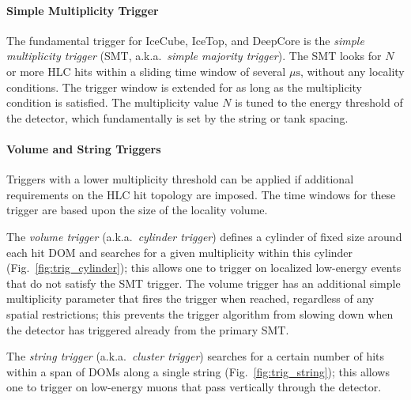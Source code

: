 \paragraph{Simple Multiplicity Trigger}

The fundamental trigger for IceCube, IceTop, and DeepCore is the \emph{simple
multiplicity trigger} (SMT, a.k.a.~\emph{simple majority trigger}).  The
SMT looks for $N$ or more HLC hits within a sliding time window of several
$\mu\mathrm{s}$, without any locality conditions.  The trigger window is
extended for as long as the multiplicity condition is satisfied.
The multiplicity value $N$ is tuned to the energy threshold of the
detector, which fundamentally is set by the string or tank spacing. 

\paragraph{Volume and String Triggers}

Triggers with a lower multiplicity threshold can be applied if additional requirements on the
HLC hit topology are imposed.  The time windows for these trigger are based upon the
size of the locality volume.

The \emph{volume trigger} (a.k.a.~\emph{cylinder
  trigger}) defines a cylinder of fixed size around each hit DOM and
searches for a given multiplicity within this cylinder
(Fig.~\ref{fig:trig_cylinder}); this allows one to trigger on localized
low-energy events that do not satisfy the SMT trigger.  The volume trigger
has an additional simple multiplicity parameter that fires the trigger when
reached, regardless of any spatial restrictions; this prevents the trigger
algorithm from slowing down when the detector has triggered already from
the primary SMT.

The \emph{string trigger} (a.k.a.~\emph{cluster trigger}) searches for a
certain number of hits within a span of DOMs along a single
string (Fig.~\ref{fig:trig_string}); this allows one to trigger on
low-energy muons that pass vertically 
through the detector.  


